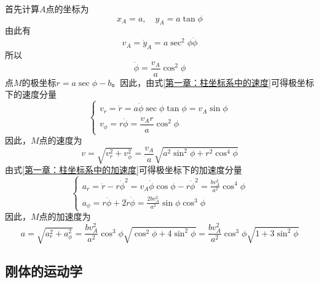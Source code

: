 \begin{solution}
首先计算$A$点的坐标为
\begin{equation*}
	x_A = a,\quad y_A = a\tan \phi
\end{equation*}
由此有
\begin{equation*}
	v_A = \dot{y}_A = a\sec^2 \phi \dot{\phi}
\end{equation*}
所以
\begin{equation*}
	\dot{\phi} = \frac{v_A}{a} \cos^2 \phi
\end{equation*}
点$M$的极坐标$r = a\sec \phi - b$。因此，由式\eqref{第一章：柱坐标系中的速度}可得极坐标下的速度分量
\begin{equation*}
\begin{cases}
	v_r = \dot{r} = a \dot{\phi} \sec \phi \tan \phi = v_A \sin \phi \\
	v_\phi = r \dot{\phi} = \dfrac{v_A r}{a} \cos^2 \phi
\end{cases}
\end{equation*}
因此，$M$点的速度为
\begin{equation*}
	v = \sqrt{v_r^2+v_\phi^2} = \frac{v_A}{a}\sqrt{a^2 \sin^2 \phi + r^2 \cos^4 \phi}
\end{equation*}
由式\eqref{第一章：柱坐标系中的加速度}可得极坐标下的加速度分量
\begin{equation*}
\begin{cases}
	\displaystyle a_r = \ddot{r}-r\dot{\phi}^2 = v_A\dot{\phi} \cos \phi - r\dot{\phi}^2 = \frac{b v_A^2}{a^2} \cos^4 \phi \\[1.5ex]
	\displaystyle a_\phi = r\ddot{\phi} + 2\dot{r}\dot{\phi} = \frac{2bv_A^2}{a^2}\sin \phi \cos^3 \phi
\end{cases}
\end{equation*}
因此，$M$点的加速度为
\begin{equation*}
	a = \sqrt{a_r^2 + a_\phi^2} = \frac{b v_A^2}{a^2} \cos^3 \phi \sqrt{\cos^2\phi + 4\sin^2 \phi} = \frac{b v_A^2}{a^2} \cos^3 \phi \sqrt{1 + 3\sin^2 \phi}
\end{equation*}
\end{solution}

\subsection{刚体的运动学}

